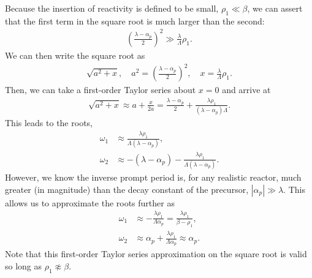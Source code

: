 Because the insertion of reactivity is defined to be small, $\rho_1 \ll \beta$, we can assert that the first term in the square root is much larger than the second:
\begin{align}
   \left( \frac{ \lambda - \alpha_p }{ 2 } \right)^2 \gg \frac{\lambda}{\Lambda} \rho_1 . \nonumber
\end{align}
We can then write the square root as
\begin{align}
  \sqrt{ a^2 + x } , \quad a^2 =  \left( \frac{ \lambda - \alpha_p }{ 2 } \right)^2, \quad x = \frac{\lambda}{\Lambda} \rho_1 . \nonumber
\end{align}
Then, we can take a first-order Taylor series about $x = 0$ and arrive at
\begin{align}
  \sqrt{ a^2 + x } \approx a + \frac{x}{2a} =  \frac{ \lambda - \alpha_p }{ 2 }  + \frac{ \lambda \rho_1 }{ ( \lambda - \alpha_p ) \Lambda } . \nonumber
\end{align}
This leads to the roots,
\begin{subequations}
\begin{align}
  \omega_1 &\approx \frac{ \lambda \rho_1 }{ \Lambda ( \lambda - \alpha_p ) } , \\
  \omega_2 &\approx -( \lambda - \alpha_p ) -  \frac{ \lambda \rho_1 }{ \Lambda ( \lambda - \alpha_p ) } .
\end{align}
\end{subequations}
However, we know the inverse prompt period is, for any realistic reactor, much greater (in magnitude) than the decay constant of the precursor, $|\alpha_p| \gg \lambda$. This allows us to approximate the roots further as
\begin{subequations}
\begin{align}
  \omega_1 &\approx -\frac{ \lambda \rho_1 }{ \Lambda \alpha_p }  =  \frac{ \lambda \rho_1 }{ \beta - \rho_1 }, \\
  \omega_2 &\approx \alpha_p +  \frac{ \lambda \rho_1 }{ \Lambda \alpha_p } \approx \alpha_p .
\end{align}
\end{subequations}
Note that this first-order Taylor series approximation on the square root is valid so long as $\rho_1 \not\approx \beta$. 


